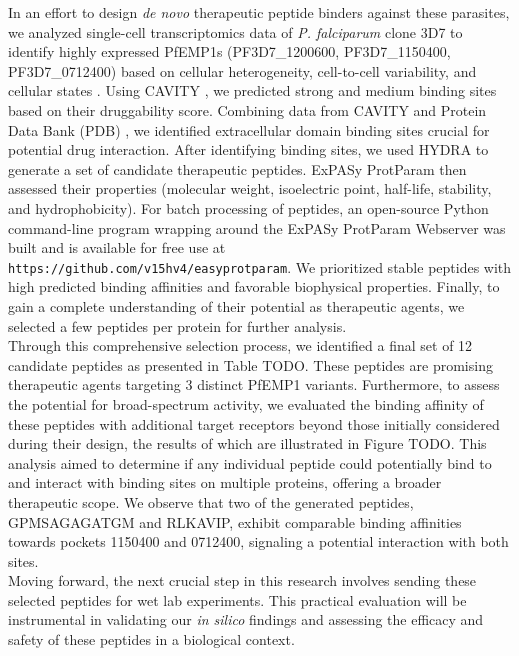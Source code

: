 In an effort to design \textit{de novo} therapeutic peptide binders against these parasites, we analyzed single-cell transcriptomics data of \textit{P. falciparum} clone 3D7 to identify highly expressed PfEMP1s (PF3D7\_1200600, PF3D7\_1150400, PF3D7\_0712400) based on cellular heterogeneity, cell-to-cell variability, and cellular states \cite{choudhuri2024computational}. Using CAVITY \cite{Yuan2013}, we predicted strong and medium binding sites based on their druggability score. Combining data from CAVITY and Protein Data Bank (PDB) \cite{Berman2000}, we identified extracellular domain binding sites crucial for potential drug interaction. After identifying binding sites, we used HYDRA to generate a set of candidate therapeutic peptides. ExPASy ProtParam \cite{gasteiger2003expasy} then assessed their properties (molecular weight, isoelectric point, half-life, stability, and hydrophobicity). For batch processing of peptides, an open-source Python command-line program wrapping around the ExPASy ProtParam Webserver was built and is available for free use at \texttt{https://github.com/v15hv4/easyprotparam}. We prioritized stable peptides with high predicted binding affinities and favorable biophysical properties. Finally, to gain a complete understanding of their potential as therapeutic agents, we selected a few peptides per protein for further analysis. \\

Through this comprehensive selection process, we identified a final set of 12 candidate peptides as presented in Table TODO. These peptides are promising therapeutic agents targeting 3 distinct PfEMP1 variants. Furthermore, to assess the potential for broad-spectrum activity, we evaluated the binding affinity of these peptides with additional target receptors beyond those initially considered during their design, the results of which are illustrated in Figure TODO. This analysis aimed to determine if any individual peptide could potentially bind to and interact with binding sites on multiple proteins, offering a broader therapeutic scope. We observe that two of the generated peptides, GPMSAGAGATGM and RLKAVIP, exhibit comparable binding affinities towards pockets 1150400 and 0712400, signaling a potential interaction with both sites. \\

Moving forward, the next crucial step in this research involves sending these selected peptides for wet lab experiments. This practical evaluation will be instrumental in validating our \textit{in silico} findings and assessing the efficacy and safety of these peptides in a biological context. \\
